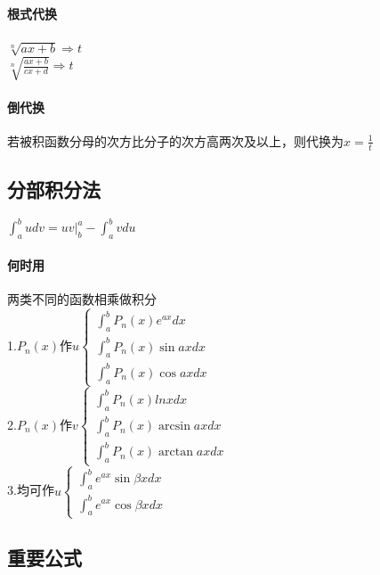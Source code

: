 \documentclass{article}
\begin{document}
\begin{flushleft}
	\paragraph{根式代换}
	$\sqrt[n]{ax+b} \Rightarrow t$\\
	$\sqrt[n]{\frac{ax+b}{cx+d}} \Rightarrow t$\\
	\paragraph{倒代换}
	若被积函数分母的次方比分子的次方高两次及以上，则代换为$x=\frac{1}{t}$\\
	
	\subsection{分部积分法}
	
	$\int_{a}^{b}udv=uv|_b^a-\int_{a}^{b}vdu$\\
	\paragraph{何时用}
	两类不同的函数相乘做积分\\
	1.$P_n(x)$作$u \left\{
	\begin{array}{lcl}
	\int_{a}^{b} P_n(x)e^{ax}dx\\
	\int_{a}^{b} P_n(x)\sin axdx\\
	\int_{a}^{b} P_n(x)\cos axdx
	\end{array} \right.$\\
	2.$P_n(x)$作$v \left\{
	\begin{array}{lcl}
	\int_{a}^{b} P_n(x)lnxdx\\
	\int_{a}^{b} P_n(x)\arcsin axdx\\
	\int_{a}^{b} P_n(x)\arctan axdx
	\end{array} \right.$\\
	3.均可作$u \left\{
	\begin{array}{lcl}
	\int_{a}^{b} e^{ax}\sin \beta xdx\\
	\int_{a}^{b} e^{ax}\cos \beta xdx
	\end{array} \right.$\\
	
	\subsection{重要公式}
	

\end{flushleft}
\end{document}
